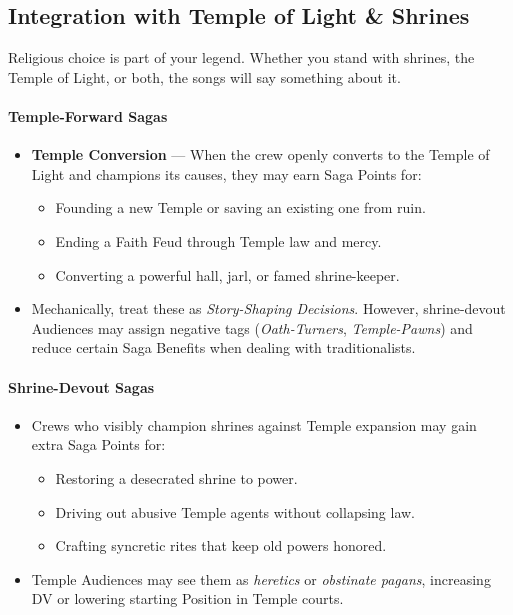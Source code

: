 \documentclass[11pt]{article}
\begin{document}
\subsection{Integration with Temple of Light \& Shrines}

Religious choice is part of your legend. Whether you stand with shrines, the Temple of Light, or
both, the songs will say something about it.

\paragraph*{Temple-Forward Sagas}
\begin{itemize}
  \item \textbf{Temple Conversion} --- When the crew openly converts to the Temple of Light and
        champions its causes, they may earn Saga Points for:
        \begin{itemize}
          \item Founding a new Temple or saving an existing one from ruin.
          \item Ending a Faith Feud through Temple law and mercy.
          \item Converting a powerful hall, jarl, or famed shrine-keeper.
        \end{itemize}
  \item Mechanically, treat these as \emph{Story-Shaping Decisions}. However, shrine-devout
        Audiences may assign negative tags (\emph{Oath-Turners}, \emph{Temple-Pawns}) and reduce
        certain Saga Benefits when dealing with traditionalists.
\end{itemize}

\paragraph*{Shrine-Devout Sagas}
\begin{itemize}
  \item Crews who visibly champion shrines against Temple expansion may gain extra Saga Points for:
        \begin{itemize}
          \item Restoring a desecrated shrine to power.
          \item Driving out abusive Temple agents without collapsing law.
          \item Crafting syncretic rites that keep old powers honored.
        \end{itemize}
  \item Temple Audiences may see them as \emph{heretics} or \emph{obstinate pagans}, increasing
        DV or lowering starting Position in Temple courts.
\end{itemize}
\end{document}
